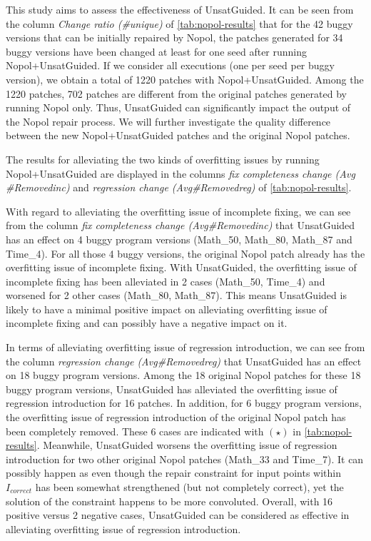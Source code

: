 \begin{landscape}
	
\end{landscape}

This study aims to assess the effectiveness of UnsatGuided. 
It can be seen from the column \emph{Change ratio (\#unique)} of \autoref{tab:nopol-results} that for the 42 buggy versions that can be initially repaired by Nopol, the patches generated for 34 buggy versions have been changed at least for one seed after running Nopol+UnsatGuided. 
If we consider all executions (one per seed per buggy version), we obtain a total of 1220 patches with Nopol+UnsatGuided. 
Among the 1220 patches, 702 patches are different from the original patches generated by running Nopol only. 
Thus, UnsatGuided can significantly impact the output of the Nopol repair process. 
We will further investigate the quality difference between the new Nopol+UnsatGuided patches and the original Nopol patches. 

The results for alleviating the two kinds of overfitting issues by running Nopol+UnsatGuided are displayed in the columns \emph{fix completeness change (Avg \#Removedinc)} and \emph{regression change (Avg\#Removedreg)} of \autoref{tab:nopol-results}.

With regard to alleviating the overfitting issue of incomplete fixing, we can see from the column \emph{fix completeness change (Avg\#Removedinc)} that UnsatGuided has an effect on 4 buggy program versions (Math\_50, Math\_80, Math\_87 and Time\_4). 
For all those 4 buggy versions, the original Nopol patch already has the overfitting issue of incomplete fixing. 
With UnsatGuided, the overfitting issue of incomplete fixing has been alleviated in 2 cases (Math\_50, Time\_4) and worsened for 2 other cases (Math\_80, Math\_87). 
This means UnsatGuided is likely to have a minimal positive impact on alleviating overfitting issue of incomplete fixing and can possibly have a negative impact on it.

In terms of alleviating overfitting issue of regression introduction, we can see from the column \emph{regression change (Avg\#Removedreg)} that UnsatGuided has an effect on 18 buggy program versions. 
Among the 18 original Nopol patches for these 18 buggy program versions, UnsatGuided has alleviated the overfitting issue of regression introduction for 16 patches. 
In addition, for 6 buggy program versions, the overfitting issue of regression introduction of the original Nopol patch has been completely removed.  
These 6 cases are indicated with $(\star)$ in \autoref{tab:nopol-results}. 
Meanwhile, UnsatGuided worsens the overfitting issue of regression introduction for two other original Nopol patches (Math\_33 and Time\_7). 
It can possibly happen as even though the repair constraint for input points within $I_{correct}$ has been somewhat strengthened (but not completely correct), yet the solution of the constraint happens to be more convoluted.
Overall, with 16 positive versus 2 negative cases, UnsatGuided can be considered as effective in alleviating overfitting issue of regression introduction. 

